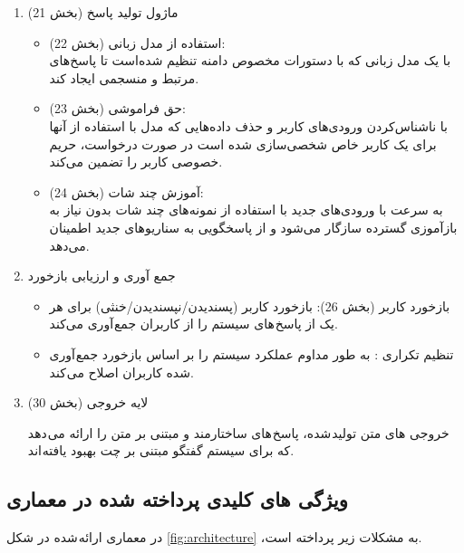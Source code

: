 \begin{enumerate}
\item
ماژول تولید پاسخ (بخش 21)
\begin{itemize}
\item
استفاده از مدل زبانی (بخش 22):\\
با یک مدل زبانی که با دستورات مخصوص دامنه تنظیم شده‌است تا پاسخ‌های مرتبط و منسجمی ایجاد کند.
\item
حق فراموشی (بخش 23):\\
با ناشناس‌کردن ورودی‌های کاربر و حذف داده‌هایی که مدل با استفاده از آنها برای یک کاربر خاص شخصی‌سازی شده است در صورت درخواست، حریم خصوصی کاربر را تضمین می‌کند.
\item
آموزش چند شات (بخش 24):\\
به سرعت با ورودی‌های جدید با استفاده از نمونه‌های چند شات بدون نیاز به بازآموزی گسترده سازگار می‌شود و از پاسخگویی به سناریوهای جدید اطمینان می‌دهد.
\end{itemize}

\item
جمع آوری و ارزیابی بازخورد 
\begin{itemize}
\item
بازخورد کاربر (بخش 26): بازخورد کاربر (پسندیدن/نپسندیدن/خنثی) برای هر یک از پاسخ های سیستم را از کاربران جمع آوری می‌کند.
\item
تنظیم تکراری%
: به طور مداوم عملکرد سیستم را بر اساس بازخورد جمع آوری شده کاربران اصلاح می کند.
\end{itemize}


\item
لایه خروجی (بخش 30)

خروجی های متن تولید شده، پاسخ های ساختارمند و مبتنی بر متن را ارائه می دهد که برای سیستم گفتگو مبتنی بر چت بهبود یافته اند.

\end{enumerate}

\subsection{ویژگی های کلیدی پرداخته شده در معماری}
در معماری ارائه شده در شکل%
\ref{fig:architecture}
 ،به مشکلات زیر پرداخته است.
 
